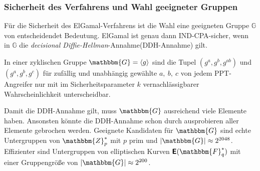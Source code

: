 \subsubsection{Sicherheit des Verfahrens und Wahl  geeigneter Gruppen}
Für die Sicherheit des ElGamal-Verfahrens ist die Wahl eine
geeigneten Gruppe $\mathbb{G}$ von entscheidendet Bedeutung. ElGamal ist genau
dann IND-CPA-sicher, wenn in $\mathbb{G}$ die \emph{decisional
  Diffie-Hellman}-Annahme(DDH-Annahme) gilt.
\begin{definition}
In einer zyklischen Gruppe $\mathbbm{G} = \langle g \rangle$ sind die Tupel
$(g^a, g^b, g^{ab})$ und $(g^a, g^b, g^c)$ für zufällig und unabhängig
gewählte $a,~b,~c$ von jedem PPT-Angreifer nur mit im Sicherheitsparameter $k$ vernachlässigbarer
Wahrscheinlichkeit unterscheidbar.
\end{definition}

Damit die DDH-Annahme gilt, muss $\mathbbm{G}$ ausreichend viele
Elemente haben. Ansonsten könnte die DDH-Annahme schon durch
ausprobieren aller Elemente gebrochen werden. Geeignete Kandidaten für
$\mathbbm{G}$ sind echte Untergruppen von $\mathbbm{Z}^*_p$ mit $p$ prim
und $|\mathbbm{G}| \approx 2^{2048}$. Effizienter sind Untergruppen von
elliptischen Kurven $\boldsymbol{\mathsf{E}}(\mathbbm{F}^*_q)$ mit einer
Gruppengröße von $|\mathbbm{G}| \approx 2^{200}$.


